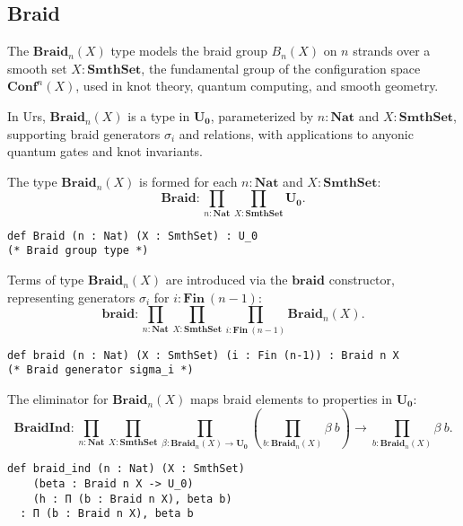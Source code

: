 \documentclass{article}
\begin{document}
\subsection{Braid}

The $\mathbf{Braid}_n(X)$ type models the braid group $B_n(X)$ on $n$ strands over
a smooth set $X : \mathbf{SmthSet}$, the fundamental group of the configuration
space $\mathbf{Conf}^n(X)$, used in knot theory, quantum computing, and smooth geometry.

In Urs, $\mathbf{Braid}_n(X)$ is a type in $\mathbf{U_0}$, parameterized by
$n : \mathbf{Nat}$ and $X : \mathbf{SmthSet}$, supporting braid generators
$\sigma_i$ and relations, with applications to anyonic quantum gates and knot invariants.

\begin{definition}
The type $\mathbf{Braid}_n(X)$ is formed for each $n : \mathbf{Nat}$ and $X : \mathbf{SmthSet}$:
\[
    \mathbf{Braid} : \prod_{n : \mathbf{Nat}} \prod_{X : \mathbf{SmthSet}} \mathbf{U_0}.
\]
\begin{lstlisting}[mathescape=true]
def Braid (n : Nat) (X : SmthSet) : U_0
(* Braid group type *)
\end{lstlisting}
\end{definition}

\begin{definition}\label{def:braid-intro}
Terms of type $\mathbf{Braid}_n(X)$ are introduced via the $\mathbf{braid}$ constructor,
representing generators $\sigma_i$ for $i : \mathbf{Fin}\ (n-1)$:
\[
    \mathbf{braid} : \prod_{n : \mathbf{Nat}} \prod_{X : \mathbf{SmthSet}} \prod_{i : \mathbf{Fin}\ (n-1)} \mathbf{Braid}_n(X).
\]
\begin{lstlisting}[mathescape=true]
def braid (n : Nat) (X : SmthSet) (i : Fin (n-1)) : Braid n X
(* Braid generator sigma_i *)
\end{lstlisting}
\end{definition}

\begin{definition}\label{def:braid-elim}
The eliminator for $\mathbf{Braid}_n(X)$ maps braid elements to properties in $\mathbf{U_0}$:
\[
\mathbf{BraidInd} :
\prod_{n : \mathbf{Nat}} \prod_{X : \mathbf{SmthSet}}
\prod_{\beta : \mathbf{Braid}_n(X) \to \mathbf{U_0}}
\left( \prod_{b : \mathbf{Braid}_n(X)} \beta\ b \right) \to
\prod_{b : \mathbf{Braid}_n(X)} \beta\ b.
\]
\begin{lstlisting}[mathescape=true]
def braid_ind (n : Nat) (X : SmthSet)
    (beta : Braid n X -> U_0)
    (h : Π (b : Braid n X), beta b)
  : Π (b : Braid n X), beta b
\end{lstlisting}
\end{definition}
\end{document}
